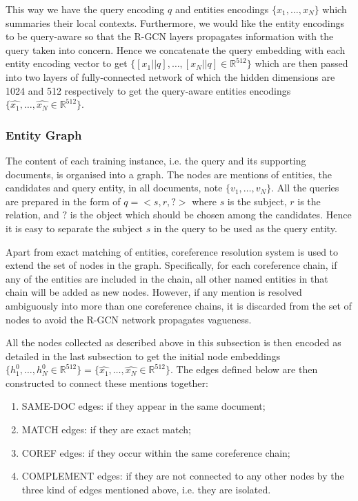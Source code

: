 \documentclass[12pt]{report}
\begin{document}
This way we have the query encoding $q$ and entities encodings $\{x_1,\dots,x_N\}$ which summaries their local contexts. Furthermore, we would like the entity encodings to be query-aware so that the R-GCN layers propagates information with the query taken into concern. Hence we concatenate the query embedding with each entity encoding vector to get $\{[x_1||q],\dots,[x_N||q]\in\mathbb{R}^{512}\}$ which are then passed into two layers of fully-connected network of which the hidden dimensions are 1024 and 512 respectively to get the query-aware entities encodings $\{\hat{x_1},\dots,\hat{x_N}\in\mathbb{R}^{512}\}$.

\subsubsection{Entity Graph}
The content of each training instance, i.e. the query and its supporting documents, is organised into a graph. The nodes are mentions of entities, the candidates and query entity, in all documents, note $\{v_1,\dots,v_N\}$. All the queries are prepared in the form of $q=<s,r,?>$ where $s$ is the subject, $r$ is the relation, and $?$ is the object which should be chosen among the candidates. Hence it is easy to separate the subject $s$ in the query to be used as the query entity.

Apart from exact matching of entities, coreference resolution system \cite{wiseman_learning_2016} is used to extend the set of nodes in the graph. Specifically, for each coreference chain, if any of the entities are included in the chain, all other named entities in that chain will be added as new nodes. However, if any mention is resolved ambiguously into more than one coreference chains, it is discarded from the set of nodes to avoid the R-GCN network propagates vagueness.

All the nodes collected as described above in this subsection is then encoded as detailed in the last subsection to get the initial node embeddings $\{h_1^0, \dots,h_N^0\in\mathbb{R}^{512}\}=\{\hat{x_1},\dots,\hat{x_N}\in\mathbb{R}^{512}\}$. The edges defined below are then constructed to connect these mentions together:
\begin{enumerate}
\item SAME-DOC edges: if they appear in the same document;
\item MATCH edges: if they are exact match;
\item COREF edges: if they occur within the same coreference chain;
\item COMPLEMENT edges: if they are not connected to any other nodes by the three kind of edges mentioned above, i.e. they are isolated.
\end{enumerate}
\end{document}
